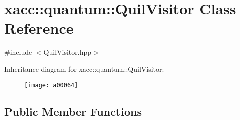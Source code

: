 \hypertarget{a00064}{}\section{xacc\+:\+:quantum\+:\+:Quil\+Visitor Class Reference}
\label{a00064}


{\ttfamily \#include $<$Quil\+Visitor.\+hpp$>$}

Inheritance diagram for xacc\+:\+:quantum\+:\+:Quil\+Visitor\+:\begin{figure}[H]
\begin{center}
\leavevmode
\texttt{[image: a00064]}
\end{center}
\end{figure}
\subsection*{Public Member Functions}
